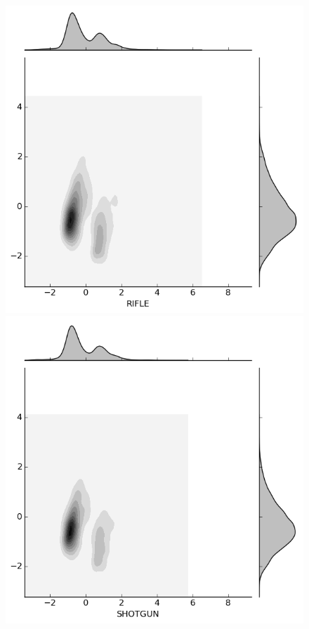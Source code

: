 \documentclass{evanarticle}
\begin{document}
\begin{figure}[H]
\begin{minipage}[b]{0.20\linewidth}
  \end{minipage}
  \quad
  \begin{minipage}[b]{0.20\linewidth}
    \includegraphics[width=\linewidth]{images/weapon/RIFLE.png}
  \end{minipage}
  \quad
  \begin{minipage}[b]{0.20\linewidth}
    \includegraphics[width=\linewidth]{images/weapon/SHOTGUN.png}
  \end{minipage}


\end{figure}
\end{document}
